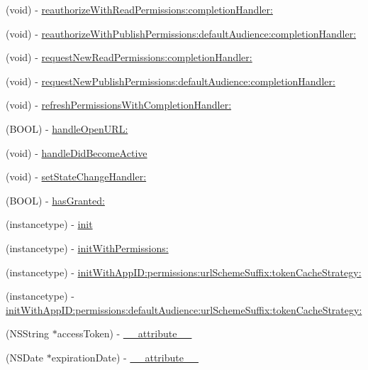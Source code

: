 \begin{DoxyCompactItemize}
(void) -\/ \hyperlink{interfaceFBSession_a5c15996bb59afc28460f92645cf6e7f0}{reauthorize\+With\+Read\+Permissions\+:completion\+Handler\+:}
\item 
(void) -\/ \hyperlink{interfaceFBSession_af0b2652e875c4996166b1c7ce3d12b73}{reauthorize\+With\+Publish\+Permissions\+:default\+Audience\+:completion\+Handler\+:}
\item 
(void) -\/ \hyperlink{interfaceFBSession_a14cf87331489399e4317bda2c718d3a3}{request\+New\+Read\+Permissions\+:completion\+Handler\+:}
\item 
(void) -\/ \hyperlink{interfaceFBSession_a86dd849f0bd1f667e6107a13deb4607d}{request\+New\+Publish\+Permissions\+:default\+Audience\+:completion\+Handler\+:}
\item 
(void) -\/ \hyperlink{interfaceFBSession_a569f5daa686e4593bd0d5e68016a15a0}{refresh\+Permissions\+With\+Completion\+Handler\+:}
\item 
(B\+O\+OL) -\/ \hyperlink{interfaceFBSession_a99548fc3fd7dc7f5b8dc24019be88000}{handle\+Open\+U\+R\+L\+:}
\item 
(void) -\/ \hyperlink{interfaceFBSession_a647536f4770fc746b6865ad610779767}{handle\+Did\+Become\+Active}
\item 
(void) -\/ \hyperlink{interfaceFBSession_a56e9467165f832f3151dadd14190868b}{set\+State\+Change\+Handler\+:}
\item 
(B\+O\+OL) -\/ \hyperlink{interfaceFBSession_aa74d6239fcde1f9d6dd9530538eb691b}{has\+Granted\+:}
\item 
(instancetype) -\/ \hyperlink{interfaceFBSession_ac5ec026f515c232cd4498cf2bc4022b4}{init}
\item 
(instancetype) -\/ \hyperlink{interfaceFBSession_a3f8419d590fb8f950aa9aee7110fb5e6}{init\+With\+Permissions\+:}
\item 
(instancetype) -\/ \hyperlink{interfaceFBSession_ae73ce3214852d1af28cbb02e7f733b37}{init\+With\+App\+I\+D\+:permissions\+:url\+Scheme\+Suffix\+:token\+Cache\+Strategy\+:}
\item 
(instancetype) -\/ \hyperlink{interfaceFBSession_a7f878c2e85b4f400378bf0c00314e7c3}{init\+With\+App\+I\+D\+:permissions\+:default\+Audience\+:url\+Scheme\+Suffix\+:token\+Cache\+Strategy\+:}
\item 
(N\+S\+String $\ast$access\+Token) -\/ \hyperlink{interfaceFBSession_a129a9e2b497ba201043bb82244156341}{\+\_\+\+\_\+attribute\+\_\+\+\_\+}
\item 
(N\+S\+Date $\ast$expiration\+Date) -\/ \hyperlink{interfaceFBSession_a42e6a02db4caa8197e8fc851bc18f1e1}{\+\_\+\+\_\+attribute\+\_\+\+\_\+}

\end{DoxyCompactItemize}
